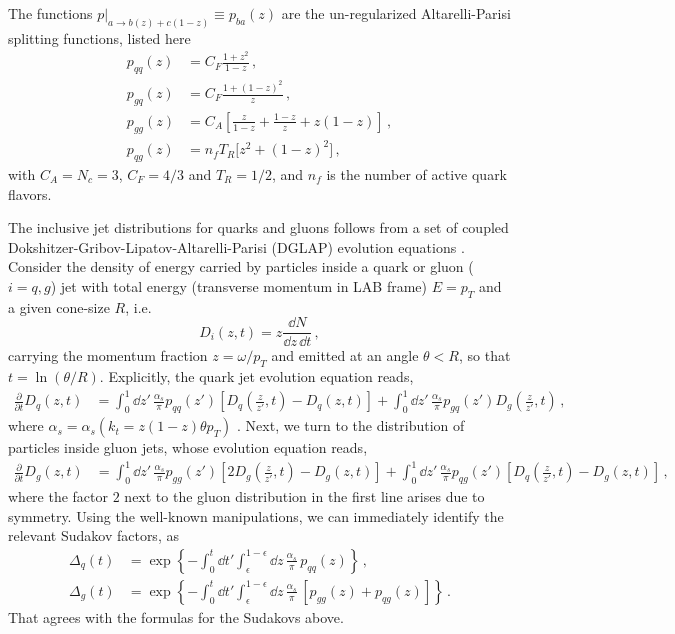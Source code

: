 \documentclass[main.tex]{subfiles}
\begin{document}
The functions $p|_{a\to b(z)+c(1-z)} \equiv p_{ba}(z)$ are the un-regularized Altarelli-Parisi splitting functions, listed here
\begin{align}
p_{qq}(z) &= C_F \frac{1+z^2}{1-z} \,,\\
p_{gq}(z) &= C_F \frac{1+(1-z)^2}{z} \,,\\
p_{gg}(z) &= C_A \left[\frac{z}{1-z} + \frac{1-z}{z} + z(1-z) \right]\,, \\
p_{qg}(z) &=  n_f T_R \big[ z^2 + (1-z)^2 \big] \,,
\end{align}
with $C_A = N_c =3$, $C_F = 4/3$ and $T_R =1/2$, and $n_f$ is the number of active quark flavors.

The inclusive jet distributions for quarks and gluons follows from a set of coupled Dokshitzer-Gribov-Lipatov-Altarelli-Parisi (DGLAP) evolution equations \cite{Dasgupta_2015}. Consider the density of energy carried by particles inside a quark or gluon ($i=q,g$) jet with total energy (transverse momentum in LAB frame) $E=p_T$ and a given cone-size $R$, i.e.
\begin{equation}
    D_{i}(z,t) = z\frac{\dd N}{\dd z \, \dd t}\,,
\end{equation}
carrying the momentum fraction $z = \omega/p_T$ and emitted at an angle $\theta<R$, so that $t = \ln (\theta/R)$.
Explicitly, the quark jet evolution equation reads,
\begin{align}
    \label{eq:qevol-1}
    \frac{\partial}{\partial t} D_{q} (z,t) & = \int_0^1 \dd z'\, \frac{\alpha_s}{\pi}p_{qq}(z')\left[ D_{q}\left( \frac{z}{z'}, t \right) - D_{q}(z,t) \right] + \int_0^1 \dd z'\, \frac{\alpha_s}{\pi}p_{gq}(z') D_{g} \left( \frac{z}{z'} ,t \right) \,,
\end{align}
where \(\alpha_s = \alpha_s(k_t=z(1-z)\theta p_T)\) . Next, we turn to the distribution of particles inside gluon jets, whose evolution equation reads,
\begin{align}
    \label{eq:gevol-1}
    \frac{\partial}{\partial t} D_{g}(z,t) &= \int_0^1 \dd z' \, \frac{\alpha_s}{\pi} p_{gg}(z') \left[2 D_{g} \left(\frac{z}{z'} ,t \right) - D_{g}(z,t) \right] + \int_0^1 \dd z'\,\frac{\alpha_s}{\pi} p_{qg}(z') \left[ D_{q} \left(\frac{z}{z'},t \right) - D_{g}(z,t) \right] \,,
\end{align}
where the factor \(2\) next to the gluon distribution in the first line arises due to symmetry. Using the well-known manipulations, we can immediately identify the relevant Sudakov factors, as
\begin{align}
    \Delta_q(t) &= \exp \left\{ - \int_0^t \dd t'\int_\epsilon^{1-\epsilon} \dd z\, \frac{\alpha_s}{\pi} \,p_{qq}(z) \right\} \,,\\
    \Delta_g(t) &= \exp \left\{ - \int_0^t \dd t'\int_\epsilon^{1-\epsilon} \dd z\, \frac{\alpha_s}{\pi} \,\left[ p_{gg}(z) + p_{qg}(z) \right] \right\} \,.
\end{align}
That agrees with the formulas for the Sudakovs above.
\end{document}
